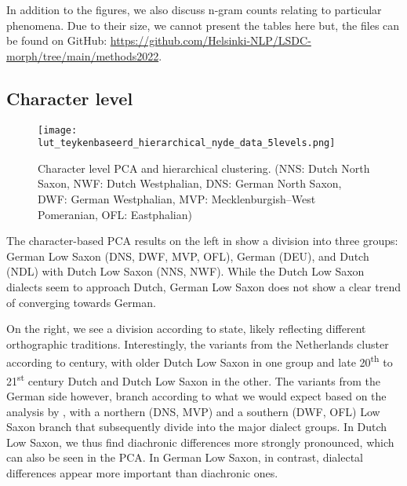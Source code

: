 \documentclass[output=paper,colorlinks,citecolor=brown]{langscibook}
\begin{document}
In addition to the figures, we also discuss n-gram counts relating to particular phenomena. Due to their size, we cannot present the tables here but, the files can be found on GitHub: \url{https://github.com/Helsinki-NLP/LSDC-morph/tree/main/methods2022}. 

\subsection{Character level}

\begin{figure}
\begin{minipage}{0.48\textwidth}
    \centering
\end{minipage}\hfill%
\begin{minipage}{0.48\textwidth}
    \centering
    \texttt{[image: lut\_teykenbaseerd\_hierarchical\_nyde\_data\_5levels.png]}
    \caption{Character level PCA and hierarchical clustering. (NNS: Dutch North Saxon, NWF: Dutch Westphalian, DNS: German North Saxon, DWF: German Westphalian, MVP: Mecklenburgish--West Pomeranian, OFL: Eastphalian)}
    \label{fig:character_based_clusters}
\end{minipage}%
\end{figure}
The character-based PCA results on the left in  show a division into three groups: German Low Saxon (DNS, DWF, MVP, OFL), German (DEU), and Dutch (NDL) with Dutch Low Saxon (NNS, NWF). While the Dutch Low Saxon dialects seem to approach Dutch, German Low Saxon does not show a clear trend of converging towards German. 

On the right, we see a division according to state, likely reflecting different orthographic traditions. Interestingly, the variants from the Netherlands cluster according to century, with older Dutch Low Saxon in one group and late 20\textsuperscript{th} to 21\textsuperscript{st} century Dutch and Dutch Low Saxon in the other. The variants from the German side however, branch according to what we would expect based on the analysis by \citet{Lameli2016}, with a northern (DNS, MVP) and a southern (DWF, OFL) Low Saxon branch that subsequently divide into the major dialect groups. In Dutch Low Saxon, we thus find diachronic differences more strongly pronounced, which can also be seen in the PCA. In German Low Saxon, in contrast, dialectal differences appear more important than diachronic ones. 
\end{document}
